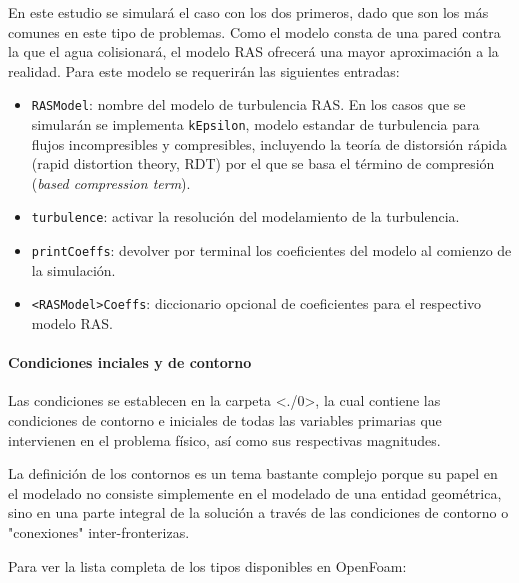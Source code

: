 En este estudio se simulará el caso con los dos primeros, dado que son
los más comunes en este tipo de problemas. Como el modelo consta de una
pared contra la que el agua colisionará, el modelo RAS ofrecerá una
mayor aproximación a la realidad. Para este modelo se requerirán las
siguientes entradas:

\begin{itemize}
\item
  \texttt{RASModel}: nombre del modelo de turbulencia RAS. En los casos
  que se simularán se implementa \texttt{kEpsilon}, modelo estandar de
  turbulencia para flujos incompresibles y compresibles, incluyendo la
  teoría de distorsión rápida (rapid distortion theory, RDT) por el que
  se basa el término de compresión (\emph{based compression term}).
\item
  \texttt{turbulence}: activar la resolución del modelamiento de la
  turbulencia.
\item
  \texttt{printCoeffs}: devolver por terminal los coeficientes del
  modelo al comienzo de la simulación.
\item
  \texttt{\textless{}RASModel\textgreater{}Coeffs}: diccionario opcional
  de coeficientes para el respectivo modelo RAS.
\end{itemize}

\paragraph{Condiciones inciales y de
contorno}\label{header-n175}

Las condiciones se establecen en la carpeta
\textless{}./0\textgreater{}, la cual contiene las condiciones de
contorno e iniciales de todas las variables primarias que intervienen en
el problema físico, así como sus respectivas magnitudes.

La definición de los contornos es un tema bastante complejo porque su
papel en el modelado no consiste simplemente en el modelado de una
entidad geométrica, sino en una parte integral de la solución a través
de las condiciones de contorno o "conexiones" inter-fronterizas.

Para ver la lista completa de los tipos disponibles en OpenFoam:

